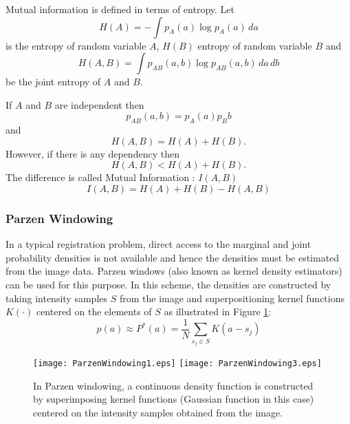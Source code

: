 Mutual information is defined in terms of entropy. Let
\begin{equation}
H(A) = - \int p_A(a) \log p_A(a)\, da
\end{equation}
is the entropy of random variable $A$, $H(B)$ entropy of 
random variable $B$ and 
\begin{equation}
H(A,B) = \int p_{AB}(a,b) \log p_{AB}(a,b)\,da\,db
\end{equation}
be the joint entropy of $A$ and $B$.

If $A$ and $B$ are independent then
\begin{equation}
p_{AB}(a,b) = p_A(a) p_B{b}
\end{equation}
and
\begin{equation}
H(A,B) = H(A) + H(B).
\end{equation}
However, if there is any dependency then
\begin{equation}
H(A,B)<H(A)+H(B).
\end{equation}
The difference is called Mutual Information : \( I(A,B) \)
\begin{equation}
I(A,B)=H(A)+H(B)-H(A,B)
\end{equation}

\subsubsection{Parzen Windowing}
In a typical registration problem, direct access to the marginal 
and joint probability densities is not available and hence the
densities must be estimated from the image data. Parzen windows 
(also known as kernel density estimators) can be used for this purpose.
In this scheme, the densities are constructed by taking intensity 
samples $S$ from the image and superpositioning kernel functions 
$K(\cdot)$ centered on the elements of $S$ as illustrated in
Figure \ref{fig:ParzenWindowing}:
\begin{equation}
p(a) \approx P^{*}(a) = \frac{1}{N} \sum_{s_j \in S} K\left(a - s_j\right)
\end{equation}

\begin{figure}
\center
\texttt{[image: ParzenWindowing1.eps]}
\texttt{[image: ParzenWindowing3.eps]}
\caption{ In Parzen windowing, a continuous density function is constructed by
superimposing kernel functions (Gaussian function in this case) centered on
the intensity samples obtained from the image. }
\label{fig:ParzenWindowing}
\end{figure}

